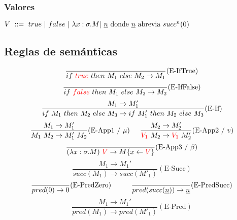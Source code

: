 \documentclass[10pt,a4paper]{article}
\begin{document}
\subsubsection*{Valores}
$ V~::=~true~|~false~|~\lambda x: \sigma . M|~\underline{n}\text{ donde } \underline{n} \text{ abrevia } succ^n(0)$

\subsection*{Reglas de semánticas}
\begin{equation*}
\frac{}{if~ \color{red}true\color{black}~ then~ M_1~ else~ M_2 \to M_1}(\text{E-IfTrue})
\end{equation*}
\vspace*{5mm}
\begin{equation*}
\frac{}{if~ \color{red}false\color{black}~ then~ M_1~ else~ M_2 \to M_2}(\text{E-IfFalse})
\end{equation*}
\vspace*{5mm}
\begin{equation*}
\frac{M_1\to M'_1}{if~ M_1~ then~ M_2~ else~ M_3\to if~ M'_1~ then~ M_2~ else~ M_3}(\text{E-If})
\end{equation*}
\vspace*{5mm}
\begin{equation*}
\frac{M_1\to M'_1}{M_1~M_2 \to 
M'_1~M_2}(\text{E-App1}~ /~ \mu)
\hspace*{5mm}
\frac{M_2 \to M'_2}{\color{red}V_1\color{black}~M_2 \to 
	\color{red}V_1\color{black}~M'_2}(\text{E-App2}~/~v)
\end{equation*}	
\vspace*{5mm}
\begin{equation*}
\frac{}{(\lambda x: \sigma . M)~\color{red}V\color{black} \to 
	M\{x\leftarrow\color{red}V\color{black}\}}(\text{E-App3}~/~\beta)
\end{equation*}
\vspace*{5mm}
\begin{equation*}
\frac{M_1\to M_1'}{succ(M_1)\to succ(M'_1)}(\text{E-Succ})
\end{equation*}
\vspace*{5mm}
\begin{equation*}
\frac{}{pred(0)\to 0}(\text{E-PredZero})\hspace*{1cm}\frac{}{pred(succ(\underline{n}))\to \underline{n}}(\text{E-PredSucc})
\end{equation*}
\vspace*{5mm}
\begin{equation*}
\frac{M_1\to M_1'}{pred(M_1)\to pred(M'_1)}(\text{E-Pred})
\end{equation*}
\end{document}
